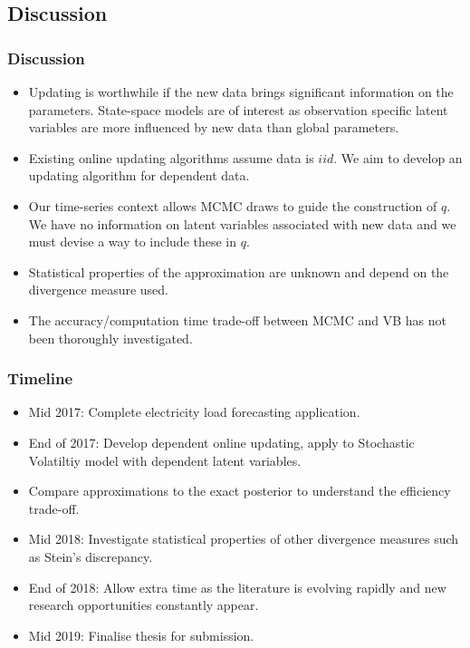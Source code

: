 \documentclass{beamer}\usepackage[]{graphicx}\usepackage[]{color}
\begin{document}
\begin{frame}
\section{Discussion}
\frametitle{Discussion}
\begin{itemize}
\item Updating is worthwhile if the new data brings significant information on the parameters. State-space models are of interest as observation specific latent variables are more influenced by new data than global parameters.
\item Existing online updating algorithms assume data is $iid$. We aim to develop an updating algorithm for dependent data.
\item Our time-series context allows MCMC draws to guide the construction of $q$. We have no information on latent variables associated with new data and we must devise a way to include these in $q$.
\item Statistical properties of the approximation are unknown and depend on the divergence measure used.
\item The accuracy/computation time trade-off between MCMC and VB has not been thoroughly investigated.
\end{itemize}
\end{frame}


\begin{frame}
\frametitle{Timeline}
\begin{itemize}
\item Mid 2017: Complete electricity load forecasting application.
\item End of 2017: Develop dependent online updating, apply to Stochastic Volatiltiy model with dependent latent variables.
\item Compare approximations to the exact posterior to understand the efficiency trade-off.
\item Mid 2018: Investigate statistical properties of other divergence measures such as Stein's discrepancy.
\item End of 2018: Allow extra time as the literature is evolving rapidly and new research opportunities constantly appear.
\item Mid 2019: Finalise thesis for submission.
\end{itemize}
\end{frame}
\end{document}
